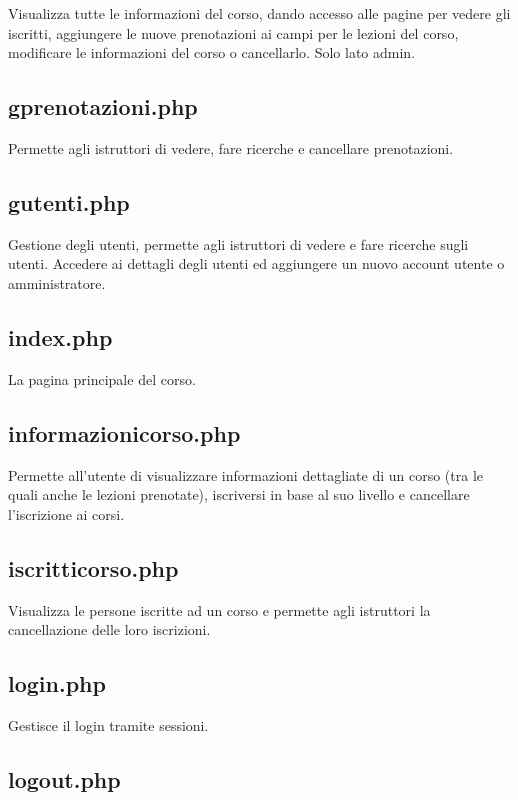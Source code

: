Visualizza tutte le informazioni del corso, dando accesso alle pagine per vedere gli iscritti, aggiungere le nuove prenotazioni ai campi per le lezioni del corso, modificare le informazioni del corso o cancellarlo. Solo lato admin.

\subsection{gprenotazioni.php}

Permette agli istruttori di vedere, fare ricerche e cancellare prenotazioni.

\subsection{gutenti.php}

Gestione degli utenti, permette agli istruttori di vedere e fare ricerche sugli utenti. Accedere ai dettagli degli utenti ed aggiungere un nuovo account utente o amministratore. 

\subsection{index.php}

La pagina principale del corso.

\subsection{informazionicorso.php}

Permette all'utente di visualizzare informazioni dettagliate di un corso (tra le quali anche le lezioni prenotate), iscriversi in base al suo livello e cancellare l'iscrizione ai corsi.

\subsection{iscritticorso.php}

Visualizza le persone iscritte ad un corso e permette agli istruttori la cancellazione delle loro iscrizioni.

\subsection{login.php}

Gestisce il login tramite sessioni.

\subsection{logout.php}

